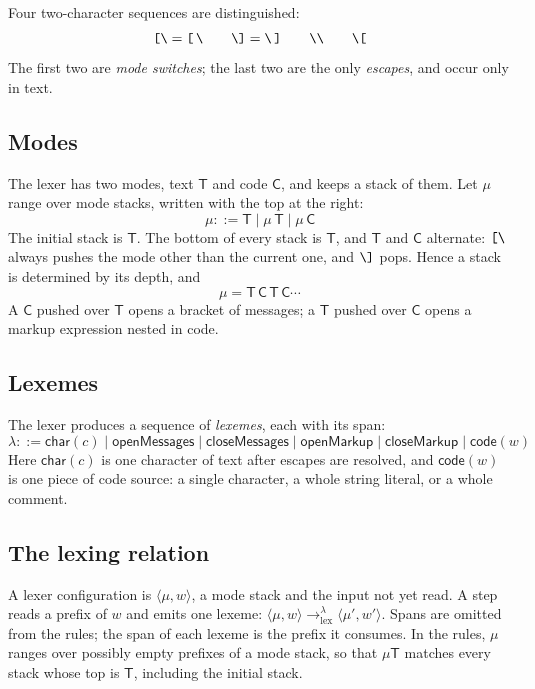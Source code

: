 \documentclass[11pt]{article}
\numberwithin{equation}{section}
\newcommand{\kw}[1]{\ensuremath{\mathsf{#1}}}
\newcommand{\str}[1]{\ensuremath{\text{\texttt{#1}}}}
\newcommand{\bs}{\textbackslash}
\newcommand{\Open}{\str{[\bs}}
\newcommand{\Close}{\str{\bs]}}
\newcommand{\TM}{\kw{T}}
\newcommand{\CM}{\kw{C}}
\newcommand{\lexto}{\longrightarrow_{\mathrm{lex}}}
\begin{document}
Four two-character sequences are distinguished:
\begin{equation}\label{eq:lexical-sequences}
\Open = \str{[}\,\str{\bs} \qquad
\Close = \str{\bs}\,\str{]} \qquad
\str{\bs\bs} \qquad
\str{\bs[}
\end{equation}
The first two are \emph{mode switches}; the last two are the only
\emph{escapes}, and occur only in text.

\subsection{Modes}

The lexer has two modes, text $\TM$ and code $\CM$, and keeps a stack of
them.  Let $\mu$ range over mode stacks, written with the top at the right:
\begin{equation}\label{eq:mode-stacks}
\mu ::= \TM \mid \mu\,\TM \mid \mu\,\CM
\end{equation}
The initial stack is $\TM$.  The bottom of every stack is $\TM$, and $\TM$
and $\CM$ alternate: $\Open$ always pushes the mode other than the current
one, and $\Close$ pops.  Hence a stack is determined by its depth, and
\begin{equation}\label{eq:mode-alternation}
\mu = \TM\,\CM\,\TM\,\CM \cdots
\end{equation}
A $\CM$ pushed over $\TM$ opens a bracket of messages; a $\TM$ pushed over
$\CM$ opens a markup expression nested in code.

\subsection{Lexemes}

The lexer produces a sequence of \emph{lexemes}, each with its span:
\begin{equation}\label{eq:lexemes}
\lambda ::= \kw{char}(c) \mid \kw{openMessages} \mid \kw{closeMessages}
  \mid \kw{openMarkup} \mid \kw{closeMarkup} \mid \kw{code}(w)
\end{equation}
Here $\kw{char}(c)$ is one character of text after escapes are resolved,
and $\kw{code}(w)$ is one piece of code source: a single character, a whole
string literal, or a whole comment.

\subsection{The lexing relation}

A lexer configuration is $\langle \mu, w \rangle$, a mode stack and the
input not yet read.  A step reads a prefix of $w$ and emits one lexeme:
$\langle \mu, w \rangle \lexto^{\lambda} \langle \mu', w' \rangle$.
Spans are omitted from the rules; the span of each lexeme is the prefix it
consumes.  In the rules, $\mu$ ranges over possibly empty prefixes of a mode
stack, so that $\mu\TM$ matches every stack whose top is $\TM$, including the
initial stack.
\end{document}

